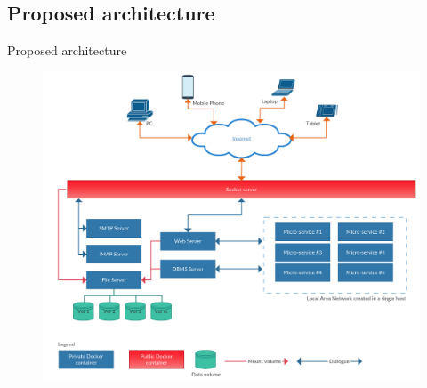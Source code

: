 \subsection{Proposed architecture}
\begin{frame}{Proposed architecture}
	\begin{figure}
		\centering{}
		\includegraphics[scale=0.11]{images/architecture.png}
	\end{figure}
\end{frame}